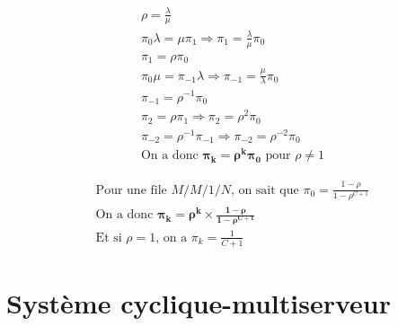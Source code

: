 \documentclass[12pt, a4paper]{article}
\begin{document}
\begin{gather*}
\rho = \frac{\lambda}{\mu} \\
\pi_{0}\lambda=\mu\pi_{1} \Rightarrow\pi_{1}=\frac{\lambda}{\mu}\pi_{0} \\
\pi_{1} = \rho\pi_{0} \\
\pi_{0}\mu = \pi_{-1}\lambda \Rightarrow \pi_{-1} = \frac{\mu}{\lambda}\pi_{0} \\
\pi_{-1} = \rho^{-1}\pi_{0} \\
\pi_{2} = \rho\pi_{1} \Rightarrow \pi_{2}=\rho^{2}\pi_{0} \\
\pi_{-2} = \rho^{-1}\pi_{-1} \Rightarrow \pi_{-2}=\rho^{-2}\pi_{0} \\
\text{On a donc } \bm{\pi_{k}=\rho^{k}\pi_{0}} \text{ pour } \rho\neq1
\end{gather*}

\begin{gather*}
\text{Pour une file } M/M/1/N \text{, on sait que } \pi_{0}=\frac{1-\rho}{1-\rho^{C+1}} \\
\text{On a donc } \bm{\pi_{k}=\rho^{k} \times \frac{1-\rho}{1-\rho^{C+1}}} \\
\text{Et si } \rho = 1 \text{, on a } \pi_{k} = \frac{1}{C+1}
\end{gather*}

\newpage
\section{Syst\`eme cyclique-multiserveur}
\end{document}
